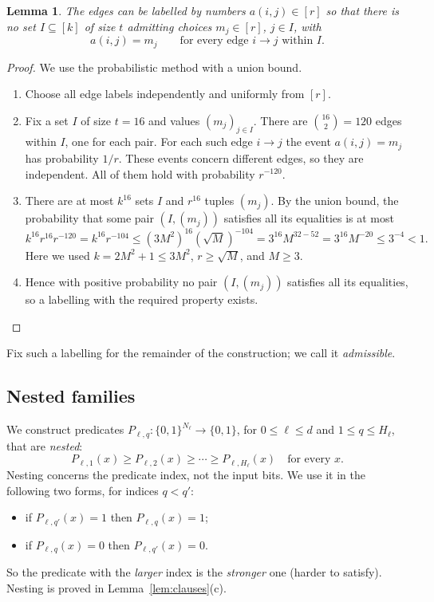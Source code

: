 \documentclass[11pt]{article}
\newtheorem{lemma}[theorem]{Lemma}
\theoremstyle{definition}
\theoremstyle{remark}
\begin{document}
\begin{lemma}\label{lem:labelling}
The edges can be labelled by numbers \(a(i,j)\in[r]\) so that there is
no set \(I\subseteq[k]\) of size \(t\) admitting choices
\(m_j\in[r]\), \(j\in I\), with
\[
 a(i,j)=m_j \qquad\text{for every edge }i\to j\text{ within }I.
\]
\end{lemma}
\begin{proof}
We use the probabilistic method with a union bound.
\begin{enumerate}[leftmargin=*]
\item Choose all edge labels independently and uniformly from \([r]\).
\item Fix a set \(I\) of size \(t=16\) and values \((m_j)_{j\in I}\). There are \(\binom{16}{2}=120\) edges within \(I\), one for each pair. For each such edge \(i\to j\) the event \(a(i,j)=m_j\) has probability \(1/r\). These events concern different edges, so they are independent. All of them hold with probability \(r^{-120}\).
\item There are at most \(k^{16}\) sets \(I\) and \(r^{16}\) tuples \((m_j)\). By the union bound, the probability that some pair \((I,(m_j))\) satisfies all its equalities is at most
\[
 k^{16}r^{16}r^{-120}=k^{16}r^{-104}\le (3M^2)^{16}(\sqrt M)^{-104}
 =3^{16}M^{32-52}=3^{16}M^{-20}\le3^{-4}<1.
\]
Here we used \(k=2M^2+1\le3M^2\), \(r\ge\sqrt M\), and \(M\ge3\).
\item Hence with positive probability no pair \((I,(m_j))\) satisfies all its equalities, so a labelling with the required property exists.\qedhere
\end{enumerate}
\end{proof}

Fix such a labelling for the remainder of the construction; we call it \emph{admissible}.

\subsection{Nested families}

We construct predicates \(P_{\ell,q}:\{0,1\}^{N_\ell}\to\{0,1\}\), for \(0\le\ell\le d\) and
\(1\le q\le H_\ell\), that are \emph{nested}:
\[
 P_{\ell,1}(x)\ge P_{\ell,2}(x)\ge\cdots
 \ge P_{\ell,H_\ell}(x)\quad\text{for every }x.
\]
Nesting concerns the predicate index, not the input bits.
We use it in the following two forms, for indices \(q<q'\):
\begin{itemize}[leftmargin=*]
\item[(N1)] if \(P_{\ell,q'}(x)=1\) then \(P_{\ell,q}(x)=1\);
\item[(N0)] if \(P_{\ell,q}(x)=0\) then \(P_{\ell,q'}(x)=0\).
\end{itemize}
So the predicate with the \emph{larger} index is the \emph{stronger} one (harder to satisfy).
Nesting is proved in Lemma~\ref{lem:clauses}(c).
\end{document}
